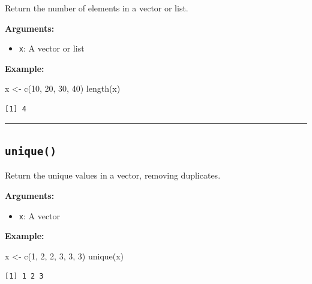 \documentclass[
  letterpaper,
  DIV=11,
  numbers=noendperiod]{scrreprt}
\newenvironment{Shaded}{\begin{snugshade}}{\end{snugshade}}
\newcommand{\DecValTok}[1]{\textcolor[rgb]{0.68,0.00,0.00}{#1}}
\newcommand{\FunctionTok}[1]{\textcolor[rgb]{0.28,0.35,0.67}{#1}}
\newcommand{\NormalTok}[1]{\textcolor[rgb]{0.00,0.23,0.31}{#1}}
\newcommand{\OtherTok}[1]{\textcolor[rgb]{0.00,0.23,0.31}{#1}}
\providecommand{\tightlist}{%
  \setlength{\itemsep}{0pt}\setlength{\parskip}{0pt}}
\begin{document}
Return the number of elements in a vector or list.

\textbf{Arguments:}

\begin{itemize}
\tightlist
\item
  \texttt{x}: A vector or list
\end{itemize}

\textbf{Example:}

\begin{Shaded}
\begin{Highlighting}[]
\NormalTok{x }\OtherTok{\textless{}{-}} \FunctionTok{c}\NormalTok{(}\DecValTok{10}\NormalTok{, }\DecValTok{20}\NormalTok{, }\DecValTok{30}\NormalTok{, }\DecValTok{40}\NormalTok{)}
\FunctionTok{length}\NormalTok{(x)}
\end{Highlighting}
\end{Shaded}

\begin{verbatim}
[1] 4
\end{verbatim}

\begin{center}\rule{0.5\linewidth}{0.5pt}\end{center}

\subsection{\texorpdfstring{\texttt{unique()}}{unique()}}\label{unique}

Return the unique values in a vector, removing duplicates.

\textbf{Arguments:}

\begin{itemize}
\tightlist
\item
  \texttt{x}: A vector
\end{itemize}

\textbf{Example:}

\begin{Shaded}
\begin{Highlighting}[]
\NormalTok{x }\OtherTok{\textless{}{-}} \FunctionTok{c}\NormalTok{(}\DecValTok{1}\NormalTok{, }\DecValTok{2}\NormalTok{, }\DecValTok{2}\NormalTok{, }\DecValTok{3}\NormalTok{, }\DecValTok{3}\NormalTok{, }\DecValTok{3}\NormalTok{)}
\FunctionTok{unique}\NormalTok{(x)}
\end{Highlighting}
\end{Shaded}

\begin{verbatim}
[1] 1 2 3
\end{verbatim}
\end{document}
